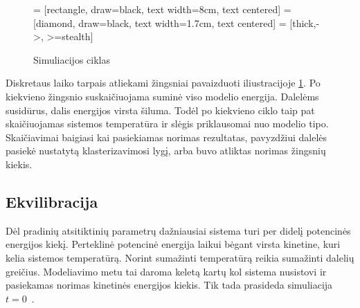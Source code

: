 \begin{figure}
\centering

\usetikzlibrary{shapes.geometric, arrows, arrows.meta, positioning, calc}
 = [rectangle, draw=black, text width=8cm, text centered]
 = [diamond, draw=black, text width=1.7cm, text centered]
 = [thick,->, >=stealth]


\caption[Simuliacijos ciklas] {Simuliacijos ciklas}
\label{fig:steps}
\end{figure}

Diskretaus laiko tarpais atliekami žingsniai pavaizduoti iliustracijoje \ref{fig:steps}.
Po kiekvieno žingsnio suskaičiuojama suminė viso modelio energija.
Dalelėms susidūrus, dalis energijos virsta šiluma.
Todėl po kiekvieno ciklo taip pat skaičiuojamas sistemos temperatūra ir slėgis priklausomai nuo modelio tipo.
Skaičiavimai baigiasi kai pasiekiamas norimas rezultatas, pavyzdžiui dalelės pasiekė nustatytą klasterizavimosi lygį,
arba buvo atliktas norimas žingsnių kiekis.


\subsection{Ekvilibracija}
\label{sec:equilibration}
Dėl pradinių atsitiktinių parametrų dažniausiai sistema turi per didelį potencinės energijos kiekį.
Perteklinė potencinė energija laikui bėgant virsta kinetine, kuri kelia sistemos temperatūrą.
Norint sumažinti temperatūrą reikia sumažinti dalelių greičius.
Modeliavimo metu tai daroma keletą kartų kol sistema nusistovi ir pasiekamas norimas kinetinės energijos kiekis.
Tik tada prasideda simuliacija \(t = 0\)~\cite{hitch}.


